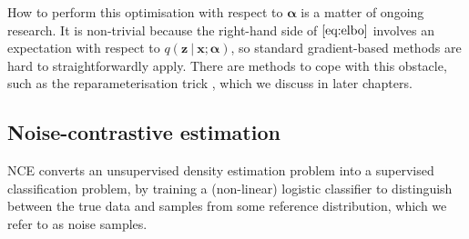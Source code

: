 \documentclass[11pt, oneside]{article}
\newcommand{\alphab}{{\boldsymbol{\alpha}}}
\newcommand{\x}{{\mathbf x}}
\newcommand{\z}{{\mathbf z}}
\newcommand\given[1][]{\:#1\vert\:}
\theoremstyle{definition}
\begin{document}
How to perform this optimisation with respect to $\alphab$ is a matter of ongoing research. It is non-trivial because the right-hand side of $\ref{eq:elbo}$ involves an expectation with respect to $q(\z \given\x; \alphab)$, so standard gradient-based methods are hard to straightforwardly apply. There are methods to cope with this obstacle, such as the reparameterisation trick \citep{kingma2015variational}, which we discuss in later chapters. 
\subsection{Noise-contrastive estimation}
\label{sec:nce}
NCE converts an unsupervised density estimation problem into a supervised classification problem, by training a (non-linear) logistic classifier to distinguish between the true data and samples from some reference distribution, which we refer to as noise samples.
\end{document}
